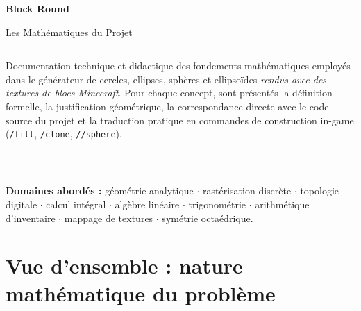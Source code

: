 \documentclass[12pt,a4paper]{scrartcl}
\newcommand{\cmd}[1]{\textcolor{earth}{\texttt{\small #1}}}
\begin{document}
\begin{titlepage}
  \centering
  \vspace*{3.5cm}
  {\sffamily\bfseries\fontsize{56}{60}\selectfont \color{accent} Block Round\par}
  \vspace{0.7cm}
  {\sffamily\LARGE\color{muted} Les Mathématiques du Projet\par}
  \vspace{1.4cm}
  {\color{rule}\rule{0.6\textwidth}{0.6pt}\par}
  \vspace{0.9cm}
  \begin{minipage}{0.82\textwidth}
    \centering\color{ink}\large
    Documentation technique et didactique des fondements mathématiques employés dans le générateur de cercles, ellipses, sphères et ellipsoïdes \emph{rendus avec des textures de blocs Minecraft}. Pour chaque concept, sont présentés la définition formelle, la justification géométrique, la correspondance directe avec le code source du projet et la traduction pratique en commandes de construction in-game (\cmd{/fill}, \cmd{/clone}, \cmd{//sphere}).
  \end{minipage}
  \vspace{0.9cm}\\
  {\color{rule}\rule{0.6\textwidth}{0.6pt}\par}
  \vspace{2cm}
  \begin{minipage}{0.78\textwidth}
    \centering\sffamily\small\color{muted}
    \textbf{Domaines abordés :} géométrie analytique $\cdot$ rastérisation discrète $\cdot$ topologie digitale $\cdot$ calcul intégral $\cdot$ algèbre linéaire $\cdot$ trigonométrie $\cdot$ arithmétique d'inventaire $\cdot$ mappage de textures $\cdot$ symétrie octaédrique.
  \end{minipage}
\end{titlepage}

\renewcommand{\contentsname}{\color{accent}Table des matières}
\tableofcontents
\thispagestyle{fancy}
\newpage

\section{Vue d'ensemble : nature mathématique du problème}
\end{document}
